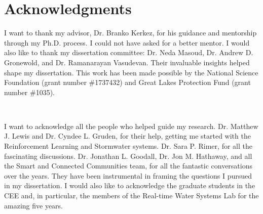 
\begingroup
\let\clearpage\relax
\let\cleardoublepage\relax
\let\cleardoublepage\relax
\chapter*{Acknowledgments}
I want to thank my advisor, Dr. Branko Kerkez, for his guidance and mentorship through my Ph.D. process. I could not have asked for a better mentor. I would also like to thank my dissertation committee: Dr. Neda Masoud, Dr. Andrew D. Gronewold, and Dr. Ramanarayan Vasudevan. Their invaluable insights helped shape my dissertation. This work has been made possible by the National Science Foundation (grant number \#1737432) and Great Lakes Protection Fund (grant number \#1035). 

\

I want to acknowledge all the people who helped guide my research. Dr. Matthew J. Lewis and Dr. Cyndee L. Gruden, for their help, getting me started with the Reinforcement Learning and Stormwater systems. Dr. Sara P. Rimer, for all the fascinating discussions. Dr. Jonathan L. Goodall, Dr. Jon M. Hathaway, and all the Smart and Connected Communities team, for all the fantastic conversations over the years. They have been instrumental in framing the questions I pursued in my dissertation. I would also like to acknowledge the graduate students in the CEE and, in particular, the members of the Real-time Water Systems Lab for the amazing five years. 
\endgroup

